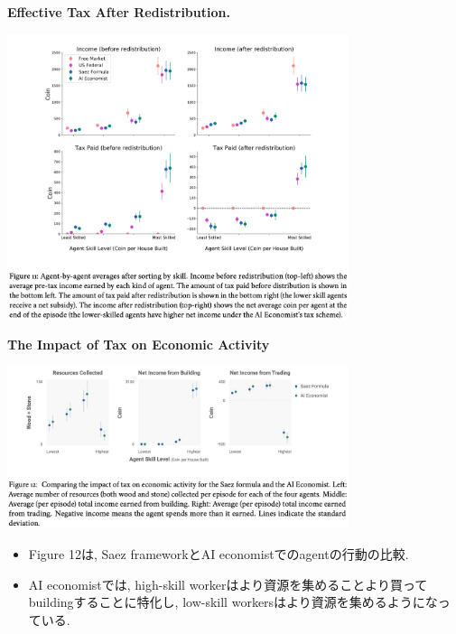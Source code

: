 \documentclass[unicode,aspectratio=169,11pt]{beamer}
\begin{document}
\begin{frame}{}{}
    {\bf Effective Tax After Redistribution.}
    \begin{center}
        \includegraphics[width=10cm]{figure11.png}
    \end{center}
\end{frame}

\begin{frame}{}{}
{\bf The Impact of Tax on Economic Activity}
\begin{center}
    \includegraphics[width=10cm]{figure12.png}
\end{center}
\begin{itemize}
    \item Figure 12は, Saez frameworkとAI economistでのagentの行動の比較.
    \item AI economistでは, high-skill workerはより資源を集めることより買ってbuildingすることに特化し, low-skill workersはより資源を集めるようになっている.
\end{itemize}
\end{frame}
\end{document}
